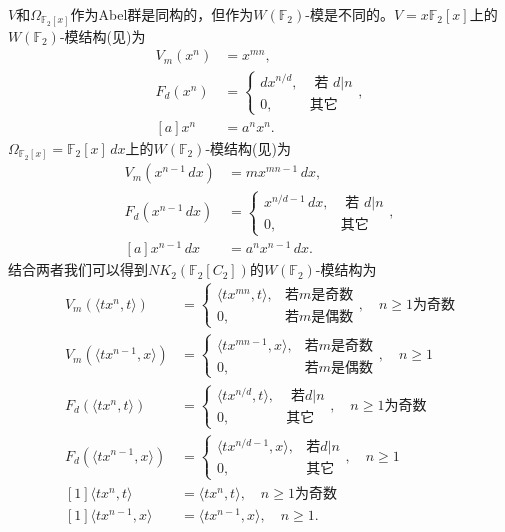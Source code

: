 $V$和$\Omega_{\mathbb{F}_2[x]}$作为Abel群是同构的，但作为$W(\mathbb{F}_2)$-模是不同的。$V=x \mathbb{F}_2[x]$上的$W(\mathbb{F}_2)$-模结构(见\cite{MR96j:16008})为 
\begin{align*}
 V_m(x^n)&=x^{mn}, \\
 F_d(x^n)&=\begin{cases}
 	dx^{n/d},& \mbox{ 若 $d|n$}\\
 	0,& \mbox{其它}
 \end{cases}, \\
 [a]x^n&=a^nx^n.
 \end{align*}
$\Omega_{\mathbb{F}_2[x]}=\mathbb{F}_2[x]\,dx $上的$W(\mathbb{F}_2)$-模结构(见\cite{MR96j:16008})为
\begin{align*}
 V_m(x^{n-1}\,dx)&=mx^{mn-1}\,dx, \\
 F_d(x^{n-1}\,dx)&=\begin{cases}
 	x^{n/d-1}\,dx,& \mbox{ 若 $d|n$}\\
 	0,& \mbox{其它}
 \end{cases}, \\
 [a]x^{n-1}\,dx&=a^nx^{n-1}\,dx.
 \end{align*}
结合两者我们可以得到$NK_2(\mathbb{F}_2[C_2])$的$W(\mathbb{F}_2)$-模结构为
\begin{align*}
 V_m(\langle tx^n,t \rangle)&=\begin{cases}
 	\langle tx^{mn},t \rangle,& \mbox{若$m$是奇数}\\
 	0,& \mbox{若$m$是偶数}
 \end{cases},\quad \mbox{$n\geq 1$为奇数} \\
  V_m(\langle tx^{n-1},x \rangle)&=\begin{cases}
 	\langle tx^{mn-1},x \rangle,& \mbox{若$m$是奇数}\\
 	0,& \mbox{若$m$是偶数}
 \end{cases}
 ,\quad \mbox{$n\geq 1$} \\
 F_d(\langle tx^n,t \rangle)&=\begin{cases}
 	\langle tx^{n/d},t \rangle,& \mbox{ 若$d|n$}\\
 	0,& \mbox{其它}
 \end{cases},\quad \mbox{$n\geq 1$为奇数} \\
 F_d(\langle tx^{n-1},x \rangle)&=\begin{cases}
 	\langle tx^{n/d-1},x \rangle,& \mbox{若$d|n$}\\
 	0,& \mbox{其它}
 \end{cases}
 ,\quad \mbox{$n\geq 1$} \\
 [1]\langle tx^n,t \rangle&=\langle tx^n,t \rangle,\quad \mbox{$n\geq 1$为奇数} \\
 [1]\langle tx^{n-1},x \rangle&=\langle tx^{n-1},x \rangle,\quad \mbox{$n\geq 1$}.
 \end{align*}



